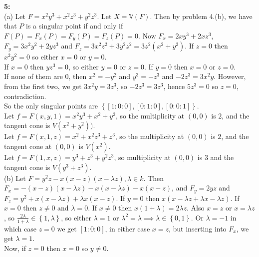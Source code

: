 \documentclass[a4paper]{article}
\begin{document}
\textbf{5:} \\
(a) Let $F = x^2 y^3 + x^2 z^3 + y^2 z^3$. Let $X = \mathbb{V} (F)$. Then by
problem 4.(b), we have that $P$ is a singular point if and only if
$F(P) = F_x(P) = F_y(P) = F_z(P) = 0$. Now
$F_x = 2xy^3 + 2xz^3$, $F_y = 3x^2 y^2 + 2yz^3$ and
$F_z = 3x^2 z^2 + 3y^2 z^2 = 3 z^2 \left( x^2 + y^2 \right) $. If
$z = 0$ then $x^2 y^2 = 0$ so either $x = 0$ or $y = 0$.\\
\linebreak
If $x = 0$ then $y z^3 = 0$, so either $y =0$ or $z = 0$. If
$y = 0$ then $x =0$ or $z=0$.\\
If none of them are $0$, then 
$x^2 = -y^2$ and $y^3 = -z^3$ and $-2z^3 = 3 x^2 y$. However, 
from the first two, we get $3x^2 y = 3z^3$, so $-2z^3 = 3z^3$, hence
$5 z^3 = 0$ so $z = 0$, contradiction.\\
So the only singular points are 
$\left\{ \left[ 1:0 :0 \right] , \left[ 0 : 1 : 0 \right] ,
\left[ 0 : 0 : 1 \right] \right\} $.\\
\linebreak
Let $f = F(x,y,1) = x^2 y^3 + x^2 + y^2 $, so
the multiplicity at $(0,0)$ is $2$, and the tangent cone is
$V(x^2 + y^2))$.\\
\linebreak
Let  $f = F(x,1,z) = x^2 + x^2 z^3 + z^3$, so the multiplicity at $(0,0)$ is
$2$, and the tangent cone at $(0,0)$ is $V(x^2)$.\\
\linebreak
Let $f = F(1,x,z) = y^3 + z^3 + y^2 z^3$, so multiplicity at $(0,0)$ is $3$ and
the tangent cone is $V\left( y^3 + z^3 \right) $.\\
\linebreak
(b) Let $F = y^2 z - x ( x-z) ( x-\lambda z), \lambda \in k$. Then
$F_x = - (x-z) ( x- \lambda z) - x (x- \lambda z) - x (x-z)$, and
$F_y = 2yz$ and  $F_z = y^2 + x (x- \lambda z) + \lambda x (x-z)$. 
If $y = 0$ then 
$x \left( x- \lambda z + \lambda x - \lambda z \right) $. If $x = 0$ then
$z \neq 0$ and $\lambda = 0$. If $x \neq 0$ then
$x (1+\lambda ) = 2 \lambda z$. Also $x = z$ or
$x = \lambda z$, so
$ \frac{2 \lambda}{1+\lambda} \in \left\{ 1, \lambda \right\} $, so
either $\lambda = 1$ or $\lambda^2 = \lambda \implies \lambda \in \left\{ 0,1
\right\} $. Or $\lambda = -1$ in which case $z = 0$ we get
$\left[ 1 : 0 : 0 \right] $, in either case $x = z$, but inserting into $F_x$,
we get
$\lambda = 1$.\\
Now, if $z = 0$ then $x = 0$ so $y \neq 0$.\\
\end{document}

